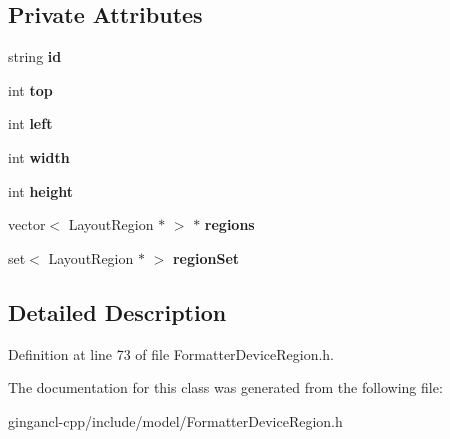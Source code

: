 \subsection*{Private Attributes}
\begin{CompactItemize}
\item 
string {\bf id}\label{classbr_1_1pucrio_1_1telemidia_1_1ginga_1_1ncl_1_1model_1_1presentation_1_1FormatterDeviceRegion_d97b05b88ce9080f35b157cfacc8eb69}

\item 
int {\bf top}\label{classbr_1_1pucrio_1_1telemidia_1_1ginga_1_1ncl_1_1model_1_1presentation_1_1FormatterDeviceRegion_f93f4f37fc2ad9c37af4a715423b110c}

\item 
int {\bf left}\label{classbr_1_1pucrio_1_1telemidia_1_1ginga_1_1ncl_1_1model_1_1presentation_1_1FormatterDeviceRegion_d8f5e19e19f12974c9713e920ec54331}

\item 
int {\bf width}\label{classbr_1_1pucrio_1_1telemidia_1_1ginga_1_1ncl_1_1model_1_1presentation_1_1FormatterDeviceRegion_2474a5474cbff19523a51eb1de01cda4}

\item 
int {\bf height}\label{classbr_1_1pucrio_1_1telemidia_1_1ginga_1_1ncl_1_1model_1_1presentation_1_1FormatterDeviceRegion_d12fc34ce789bce6c8a05d8a17138534}

\item 
vector$<$ LayoutRegion $\ast$ $>$ $\ast$ {\bf regions}\label{classbr_1_1pucrio_1_1telemidia_1_1ginga_1_1ncl_1_1model_1_1presentation_1_1FormatterDeviceRegion_f47b8d50b6b0dd2500f2182fbba76427}

\item 
set$<$ LayoutRegion $\ast$ $>$ {\bf regionSet}\label{classbr_1_1pucrio_1_1telemidia_1_1ginga_1_1ncl_1_1model_1_1presentation_1_1FormatterDeviceRegion_0fdec4e3b2f7feb4e9672740933b57d4}

\end{CompactItemize}


\subsection{Detailed Description}




Definition at line 73 of file FormatterDeviceRegion.h.

The documentation for this class was generated from the following file:\begin{CompactItemize}
\item 
gingancl-cpp/include/model/FormatterDeviceRegion.h\end{CompactItemize}
